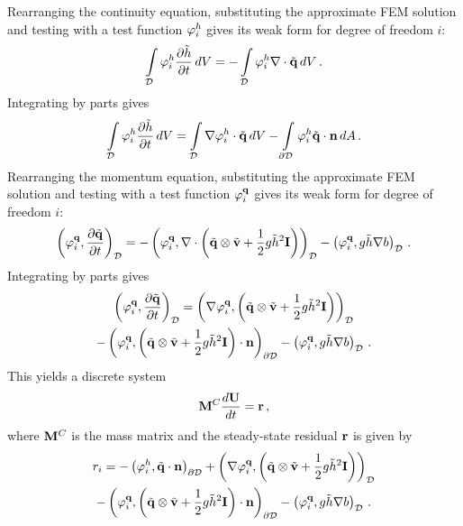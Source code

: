Rearranging the continuity equation, substituting the approximate FEM
solution and testing with a test function $\varphi_i^h$ gives its
weak form for degree of freedom $i$:
\begin{equation}
  \int\limits_{\mathcal{D}} \varphi_i^h\frac{\partial \tilde{h}}{\partial t} \,dV
  = - \int\limits_{\mathcal{D}} \varphi_i^h\nabla\cdot\tilde{\mathbf{q}} \,dV
  \,.
\end{equation}
Integrating by parts gives
\begin{equation}
  \int\limits_{\mathcal{D}} \varphi_i^h\frac{\partial \tilde{h}}{\partial t} \,dV
  = \int\limits_{\mathcal{D}} \nabla\varphi_i^h\cdot\tilde{\mathbf{q}} \,dV
  - \int\limits_{\partial\mathcal{D}} \varphi_i^h\tilde{\mathbf{q}}\cdot\mathbf{n} \,dA
  \,.
\end{equation}
Rearranging the momentum equation, substituting the approximate FEM
solution and testing with a test function $\varphi_i^{\mathbf{q}}$
gives its weak form for degree of freedom $i$:
\begin{equation}
  \left(\varphi_i^{\mathbf{q}},\frac{\partial \tilde{\mathbf{q}}}{\partial t}
  \right)_{\mathcal{D}}
  = - \left(\varphi_i^{\mathbf{q}},\nabla\cdot
    \left(\tilde{\mathbf{q}}\otimes\tilde{\mathbf{v}}
  + \frac{1}{2}g\tilde{h}^2\mathbf{I}\right)\right)_{\mathcal{D}}
  - \left(\varphi_i^{\mathbf{q}},
    g\tilde{h}\nabla b\right)_{\mathcal{D}} \,.
\end{equation}
Integrating by parts gives
\begin{multline}
  \left(\varphi_i^{\mathbf{q}},\frac{\partial \tilde{\mathbf{q}}}{\partial t}
  \right)_{\mathcal{D}}
  = \left(\nabla\varphi_i^{\mathbf{q}},
    \left(\tilde{\mathbf{q}}\otimes\tilde{\mathbf{v}}
    + \frac{1}{2}g\tilde{h}^2\mathbf{I}\right)\right)_{\mathcal{D}}
  \\- \left(\varphi_i^{\mathbf{q}},
    \left(\tilde{\mathbf{q}}\otimes\tilde{\mathbf{v}}
    + \frac{1}{2}g \tilde{h}^2\mathbf{I}\right)\cdot\mathbf{n}
    \right)_{\partial\mathcal{D}}
  - \left(\varphi_i^{\mathbf{q}},
    g\tilde{h}\nabla b\right)_{\mathcal{D}} \,.
\end{multline}
This yields a discrete system
\begin{equation}
  \mathbf{M}^C\frac{d\mathbf{U}}{dt} = \mathbf{r} \,,
\end{equation}
where $\mathbf{M}^C$ is the mass matrix and the steady-state residual
$\mathbf{r}$ is given by
\begin{multline}
  r_i =
  - \left(\varphi_i^h,\tilde{\mathbf{q}}\cdot\mathbf{n}
    \right)_{\partial\mathcal{D}}
  + \left(\nabla\varphi_i^{\mathbf{q}},
    \left(\tilde{\mathbf{q}}\otimes\tilde{\mathbf{v}}
    + \frac{1}{2}g\tilde{h}^2\mathbf{I}\right)\right)_{\mathcal{D}}
  \\- \left(\varphi_i^{\mathbf{q}},
    \left(\tilde{\mathbf{q}}\otimes\tilde{\mathbf{v}}
    + \frac{1}{2}g \tilde{h}^2\mathbf{I}\right)\cdot\mathbf{n}
    \right)_{\partial\mathcal{D}}
  - \left(\varphi_i^{\mathbf{q}},
    g\tilde{h}\nabla b\right)_{\mathcal{D}} \,.
\end{multline}
